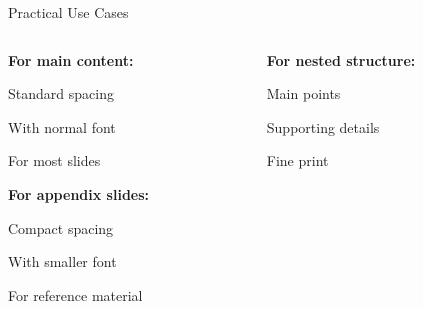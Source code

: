 \documentclass[11pt,compress,t,notes=noshow, xcolor=table]{beamer}
\begin{document}

\begin{frame}{Practical Use Cases}
  \begin{columns}[T]
    \begin{column}{0.48\textwidth}
      \textbf{For main content:}
      \begin{itemizeM}
        \item Standard spacing
        \item With normal font
        \item For most slides
      \end{itemizeM}
      
      \vspace{0.3cm}
      \textbf{For appendix slides:}
      \begin{itemizeS}[small]
        \item Compact spacing
        \item With smaller font
        \item For reference material
      \end{itemizeS}
    \end{column}
    
    \begin{column}{0.48\textwidth}
      \textbf{For nested structure:}
      \begin{kitemize}[fs=normalsize,sep=M]
        \item Main points
        \begin{kitemize}[fs=small,sep=S]
          \item Supporting details
          \begin{kitemize}[fs=footnotesize,sep=S]
            \item Fine print
          \end{kitemize}
        \end{kitemize}
      \end{kitemize}
    \end{column}
  \end{columns}
\end{frame}

\endlecture
\end{document}
